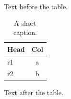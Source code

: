 \documentclass[12pt]{article}
\begin{document}
Text before the table.

\begin{longtable}{lc}
\caption{A short caption.}\\
\hline Head & Col\\\hline
\endfirsthead
\hline
\endlastfoot
r1 & a\\
r2 & b\\
\end{longtable}

Text after the table.
\end{document}
